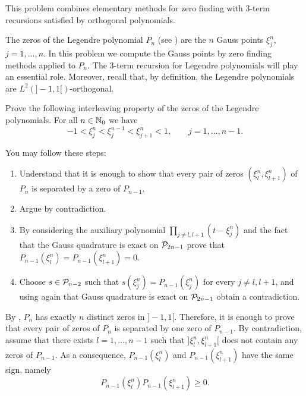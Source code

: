 
\begin{problem}
 This problem combines elementary methods for zero finding with 3-term recursions satisfied by orthogonal polynomials. 
  
The zeros of the Legendre polynomial $P_n$ (see ) are the $n$ Gauss points $\xi^n_j$, $j=1,\dots,n$. In this problem we compute the Gauss points by zero finding methods applied to $P_n$. The 3-term recursion  for Legendre polynomials will play an essential role. Moreover, recall that, by definition, the Legendre polynomials are $L^2(]-1,1[)$-orthogonal.

\begin{subproblem}[5]\label{subpb:inter}
Prove the following interleaving property of the zeros of the Legendre polynomials. For all $n\in\mathbb{N}_0$ we have
\begin{equation*}
-1<\xi^n_j<\xi^{n-1}_j<\xi^n_{j+1}<1,\qquad j=1,\dots,n-1.
\end{equation*}
 \begin{hint}
You may follow these steps:
\begin{enumerate}\itemsep0pt
\item Understand that it is enough to show that every pair of zeros $(\xi^n_l,\xi^n_{l+1})$ of $P_n$ is separated by a zero of $P_{n-1}$.
\item Argue by contradiction.
\item By considering the auxiliary polynomial $\prod_{j\neq l,l+1} (t-\xi_j^n)$ and the fact that the Gauss quadrature is exact on ${\cal P}_{2n-1}$ prove that $P_{n-1}(\xi_l^n)=P_{n-1}(\xi_{l+1}^n)=0$.
\item Choose $s\in {\cal P}_{n-2}$ such that $s(\xi^n_j)=P_{n-1}(\xi_j^n)$ for every $j\neq l,l+1$, and using again that  Gauss quadrature is exact on ${\cal P}_{2n-1}$ obtain a contradiction.
\end{enumerate}
\end{hint}

\begin{solution}
By , $P_n$ has exactly $n$ distinct zeros in $]-1,1[$. Therefore, it is enough to prove that every pair of zeros of $P_n$ is separated by one zero of $P_{n-1}$. By contradiction, assume that there exists $l=1,\dots,n-1$ such that $]\xi^n_l,\xi_{l+1}^n[$ does not contain any zeros of $P_{n-1}$. As a consequence, $P_{n-1}(\xi^n_l)$ and $P_{n-1}(\xi^n_{l+1})$ have the same sign, namely
\begin{equation}\label{eq:separate}
P_{n-1}(\xi^n_l) P_{n-1}(\xi^n_{l+1})\ge 0.
\end{equation}


\end{solution}
\end{subproblem}
\end{problem}
